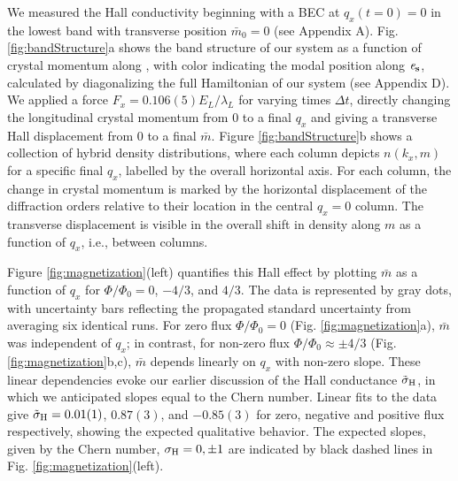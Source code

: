 	We measured the Hall conductivity beginning with a BEC at $q_x(t=0)=0$ in the lowest band with transverse position $\bar{m}_0=0$ (see Appendix A).  Fig. \ref{fig:bandStructure}a shows the band structure of our system as a function of crystal momentum along \ex, with color indicating the modal position along $\bf{\mathit{e}_s}$, calculated by diagonalizing the full Hamiltonian of our system (see Appendix D). We applied a force $F_x=0.106(5) E_L/\lambda_L$ for varying times $\Delta t$, directly changing the longitudinal crystal momentum from $0$ to a final $q_x$ and giving a transverse Hall displacement from $0$ to a final $\bar{m}$. Figure \ref{fig:bandStructure}b shows a collection of hybrid density distributions, where each column depicts $n(k_x,m)$ for a specific final $q_x$, labelled by the overall horizontal axis. For each column, the change in crystal momentum is marked by the horizontal displacement of the diffraction orders relative to their location in the central $q_x=0$ column. The transverse displacement is visible in the overall shift in density along $m$ as a function of $q_x$, i.e., between columns.  

	Figure \ref{fig:magnetization}(left) quantifies this Hall effect by plotting $\bar{m}$ as a function of $q_x$ for $\Phi/\Phi_0=0$, $-4/3$, and $4/3$. The data is represented by gray dots, with uncertainty bars reflecting the propagated standard uncertainty from averaging six identical runs. For zero flux $\Phi/\Phi_0=0$ (Fig. \ref{fig:magnetization}a), $\bar{m}$ was independent of $q_x$; in contrast, for non-zero flux $\Phi/\Phi_0\approx\pm4/3$  (Fig. \ref{fig:magnetization}b,c),  $\bar{m}$ depends linearly on $q_x$ with non-zero slope. These linear dependencies evoke our earlier discussion of the Hall conductance $\tilde{\sigma}_{\rm{H}}$, in which we anticipated slopes equal to the Chern number. Linear fits to the data give $\tilde{\sigma}_{\rm{H}}=0.01(1)$, $0.87(3)$, and $-0.85(3)$ for zero, negative and positive flux respectively, showing the expected qualitative behavior. The expected slopes, given by the Chern number, $\sigma_{\rm{H}}=0,\pm1$ are indicated by black dashed lines in Fig. \ref{fig:magnetization}(left). 

